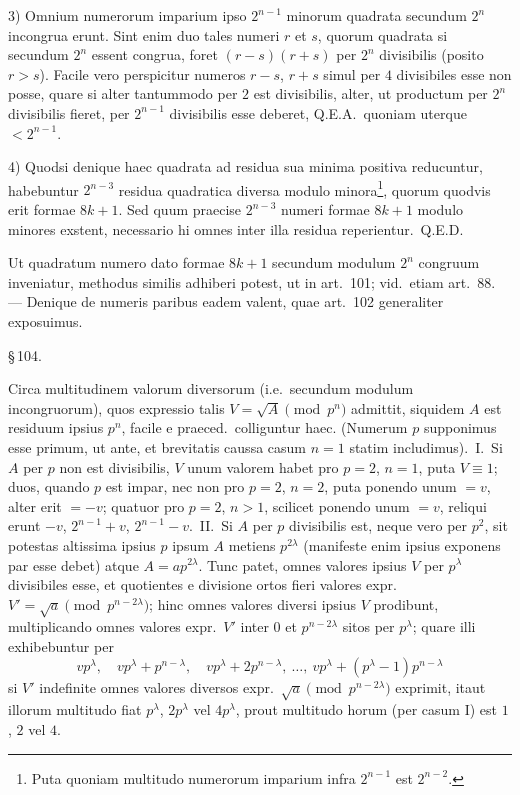 \documentclass[12pt,a4paper]{article}
\theoremstyle{plain}
\theoremstyle{definition}
\theoremstyle{remark}
\begin{document}
3) Omnium numerorum imparium ipso $2^{n-1}$ minorum quadrata secundum $2^n$ incongrua erunt. Sint enim duo tales numeri $r$ et $s$, quorum quadrata si secundum $2^n$ essent congrua, foret $(r-s)(r+s)$ per $2^n$ divisibilis (posito $r > s$). Facile vero perspicitur numeros $r-s$, $r+s$ simul per $4$ divisibiles esse non posse, quare si alter tantummodo per $2$ est divisibilis, alter, ut productum per $2^n$ divisibilis fieret, per $2^{n-1}$ divisibilis esse deberet, Q.E.A.\ quoniam uterque $< 2^{n-1}$.

4) Quodsi denique haec quadrata ad residua sua minima positiva reducuntur, habebuntur $2^{n-3}$ residua quadratica diversa modulo minora\footnote{Puta quoniam multitudo numerorum imparium infra $2^{n-1}$ est $2^{n-2}$.}, quorum quodvis erit formae $8k+1$. Sed quum praecise $2^{n-3}$ numeri formae $8k+1$ modulo minores exstent, necessario hi omnes inter illa residua reperientur.\ Q.E.D.

Ut quadratum numero dato formae $8k+1$ secundum modulum $2^n$ congruum inveniatur, methodus similis adhiberi potest, ut in art.~101; vid.\ etiam art.~88. --- Denique de numeris paribus eadem valent, quae art.~102 generaliter exposuimus.

\begin{center}\S\,104.\end{center}

Circa multitudinem valorum diversorum (i.e.\ secundum modulum incongruorum), quos expressio talis $V = \sqrt{A} \pmod{p^n}$ admittit, siquidem $A$ est residuum ipsius $p^n$, facile e praeced.\ colliguntur haec. (Numerum $p$ supponimus esse primum, ut ante, et brevitatis caussa casum $n = 1$ statim includimus).\ I.\ Si $A$ per $p$ non est divisibilis, $V$ unum valorem habet pro $p = 2$, $n = 1$, puta $V \equiv 1$; duos, quando $p$ est impar, nec non pro $p = 2$, $n = 2$, puta ponendo unum $= v$, alter erit $= -v$; quatuor pro $p = 2$, $n > 1$, scilicet ponendo unum $= v$, reliqui erunt $-v$, $2^{n-1} + v$, $2^{n-1} - v$.\ II.\ Si $A$ per $p$ divisibilis est, neque vero per $p^2$, sit potestas altissima ipsius $p$ ipsum $A$ metiens $p^{2\lambda}$ (manifeste enim ipsius exponens par esse debet) atque $A = ap^{2\lambda}$. Tunc patet, omnes valores ipsius $V$ per $p^\lambda$ divisibiles esse, et quotientes e divisione ortos fieri valores expr.\ $V' = \sqrt{a} \pmod{p^{n-2\lambda}}$; hinc omnes valores diversi ipsius $V$ prodibunt, multiplicando omnes valores expr.\ $V'$ inter $0$ et $p^{n-2\lambda}$ sitos per $p^\lambda$; quare illi exhibebuntur per
\[
v p^\lambda,\quad v p^\lambda + p^{n-\lambda},\quad v p^\lambda + 2p^{n-\lambda},\ \dots,\ v p^\lambda + (p^\lambda - 1)p^{n-\lambda}
\]
si $V'$ indefinite omnes valores diversos expr.\ $\sqrt{a} \pmod{p^{n-2\lambda}}$ exprimit, itaut illorum multitudo fiat $p^\lambda$, $2p^\lambda$ vel $4p^\lambda$, prout multitudo horum (per casum I) est $1$, $2$ vel $4$.
\end{document}

